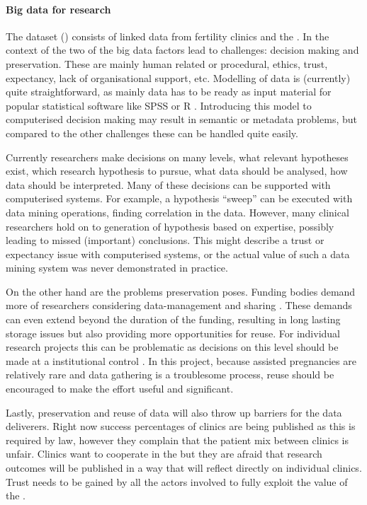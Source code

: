 \paragraph{Big data for \project{} research}
The \project{} dataset (\projectdata{}) consists of linked data from fertility clinics and the \PRN{}.
In the context of the \projectdata{} two of the big data factors lead to challenges: decision making and preservation.
These are mainly human related or procedural, \eg{} ethics, trust, expectancy, lack of organisational support, etc.
Modelling of data is (currently) quite straightforward, as mainly data has to be ready as input material for popular statistical software like SPSS \cite{spssSoftware} or R \cite{rSoftware}.
Introducing this model to computerised decision making may result in semantic or metadata problems, but compared to the other challenges these can be handled quite easily.

Currently researchers make decisions on many levels, \eg{} what relevant hypotheses exist, which research hypothesis to pursue, what data should be analysed, how data should be interpreted.
Many of these decisions can be supported with computerised systems.
For example, a hypothesis ``sweep'' can be executed with data mining operations, finding correlation in the data.
However, many clinical researchers hold on to generation of hypothesis based on expertise, possibly leading to missed (important) conclusions.
This might describe a trust or expectancy issue with computerised systems, or the actual value of such a data mining system was never demonstrated in practice.

On the other hand are the problems preservation poses.
Funding bodies demand more of researchers considering data-management and sharing \cite{dsb3lynch}.
These demands can even extend beyond the duration of the funding, resulting in long lasting storage issues but also providing more opportunities for reuse.
For individual research projects this can be problematic as decisions on this level should be made at a institutional control \cite{dsb3lynch}.
In this project, because assisted pregnancies are relatively rare and data gathering is a troublesome process, reuse should be encouraged to make the effort useful and significant.

Lastly, preservation and reuse of data will also throw up barriers for the data deliverers.
Right now success percentages of clinics are being published as this is required by law, however they complain that the patient mix between clinics is unfair.
Clinics want to cooperate in the \project{} but they are afraid that research outcomes will be published in a way that will reflect directly on individual clinics. 
Trust needs to be gained by all the actors involved to fully exploit the value of the \project{}.

